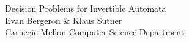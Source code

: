 \documentclass[a0]{a0poster}
\newcommand*{\concourse}{}
\theoremstyle{pleasant}
\newcommand{\0}{\underline{0}}
\newcommand{\1}{\underline{1}}
\newcommand{\2}{\underline{2}}
\begin{document}


\begin{minipage}[b]{0.55\linewidth}
  \veryHuge \color{NavyBlue} \concourse{Decision Problems for
    Invertible Automata} \color{Black}\\ %
\huge \concourse{Evan Bergeron \& Klaus Sutner}\\ %
\huge Carnegie Mellon Computer Science Department\\ %
\end{minipage}



\end{document}
